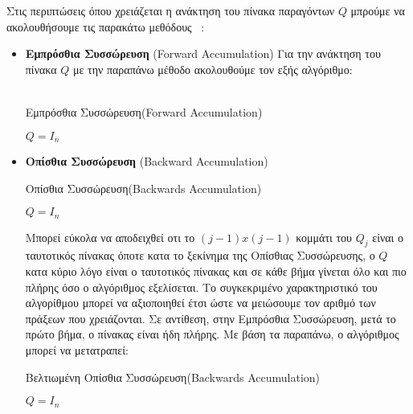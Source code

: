 Στις περιπτώσεις όπου χρειάζεται η ανάκτηση του πίνακα παραγόντων $Q$ μπρούμε να ακολουθήσουμε τις παρακάτω μεθόδους ~\cite{van1983matrix}:
\begin{itemize}
    \item \textbf{Εμπρόσθια Συσσώρευση} (\textlatin{Forward Accumulation})
    Για την ανάκτηση του πίνακα $Q$ με την παραπάνω μέθοδο ακολουθούμε τον εξής αλγόριθμο:\\\\
    \begin{algorithm}[H]
        \SetAlgoLined
        \caption{ Εμπρόσθια Συσσώρευση(\textlatin{Forward Accumulation})}
        $Q = I_n$\\
    \end{algorithm}
    \item \textbf{Οπίσθια Συσσώρευση} (\textlatin{Backward Accumulation})\\
    \begin{algorithm}[H]
        \SetAlgoLined
        \caption{ Οπίσθια Συσσώρευση(Backwards Accumulation)}
        $Q = I_n$\\
    \end{algorithm}
    
    Μπορεί εύκολα να αποδειχθεί οτι το $(j-1)x(j-1)$ κομμάτι του $Q_j$ είναι ο ταυτοτικός πίνακας όποτε κατα το ξεκίνημα της Οπίσθιας Συσσώρευσης, ο $Q$ κατα κύριο λόγο είναι ο ταυτοτικός πίνακας και σε κάθε βήμα γίνεται όλο και πιο πλήρης όσο ο αλγόριθμος εξελίσεται. Το συγκεκριμένο χαρακτηριστικό του αλγορίθμου μπορεί να αξιοποιηθεί έτσι ώστε να μειώσουμε τον αριθμό των πράξεων που χρειάζονται. Σε αντίθεση, στην Εμπρόσθια Συσσώρευση, μετά το πρώτο βήμα, ο πίνακας είναι ήδη πλήρης. Με βάση τα παραπάνω, ο αλγόριθμος μπορεί να μετατραπεί:\\
    
    \begin{algorithm}[H]
        \SetAlgoLined
        \caption{ Βελτιωμένη Οπίσθια Συσσώρευση(Backwards Accumulation)}
        $Q = I_n$\\
    \end{algorithm}
\end{itemize}

